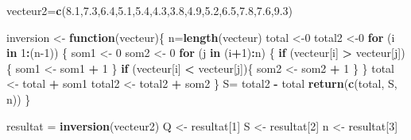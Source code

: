 \documentclass[
  12pt,
]{article}
\newenvironment{Shaded}{\begin{snugshade}}{\end{snugshade}}
\newcommand{\ControlFlowTok}[1]{\textcolor[rgb]{0.13,0.29,0.53}{\textbf{#1}}}
\newcommand{\DecValTok}[1]{\textcolor[rgb]{0.00,0.00,0.81}{#1}}
\newcommand{\FloatTok}[1]{\textcolor[rgb]{0.00,0.00,0.81}{#1}}
\newcommand{\FunctionTok}[1]{\textcolor[rgb]{0.13,0.29,0.53}{\textbf{#1}}}
\newcommand{\NormalTok}[1]{#1}
\newcommand{\OtherTok}[1]{\textcolor[rgb]{0.56,0.35,0.01}{#1}}
\newcommand{\SpecialCharTok}[1]{\textcolor[rgb]{0.81,0.36,0.00}{\textbf{#1}}}
\begin{document}
\begin{Shaded}
\begin{Highlighting}[]
\NormalTok{vecteur2}\OtherTok{=}\FunctionTok{c}\NormalTok{(}\FloatTok{8.1}\NormalTok{,}\FloatTok{7.3}\NormalTok{,}\FloatTok{6.4}\NormalTok{,}\FloatTok{5.1}\NormalTok{,}\FloatTok{5.4}\NormalTok{,}\FloatTok{4.3}\NormalTok{,}\FloatTok{3.8}\NormalTok{,}\FloatTok{4.9}\NormalTok{,}\FloatTok{5.2}\NormalTok{,}\FloatTok{6.5}\NormalTok{,}\FloatTok{7.8}\NormalTok{,}\FloatTok{7.6}\NormalTok{,}\FloatTok{9.3}\NormalTok{)}

\NormalTok{inversion }\OtherTok{\textless{}{-}} \ControlFlowTok{function}\NormalTok{(vecteur)\{}
\NormalTok{  n}\OtherTok{=}\FunctionTok{length}\NormalTok{(vecteur)}
\NormalTok{  total }\OtherTok{\textless{}{-}}\DecValTok{0}
\NormalTok{  total2 }\OtherTok{\textless{}{-}}\DecValTok{0}
  \ControlFlowTok{for}\NormalTok{ (i }\ControlFlowTok{in} \DecValTok{1}\SpecialCharTok{:}\NormalTok{(n}\DecValTok{{-}1}\NormalTok{)) \{}
\NormalTok{    som1 }\OtherTok{\textless{}{-}} \DecValTok{0}
\NormalTok{    som2 }\OtherTok{\textless{}{-}} \DecValTok{0}
    \ControlFlowTok{for}\NormalTok{ (j }\ControlFlowTok{in}\NormalTok{ (i}\SpecialCharTok{+}\DecValTok{1}\NormalTok{)}\SpecialCharTok{:}\NormalTok{n) \{}
      \ControlFlowTok{if}\NormalTok{ (vecteur[i] }\SpecialCharTok{\textgreater{}}\NormalTok{ vecteur[j]) \{}
\NormalTok{        som1 }\OtherTok{\textless{}{-}}\NormalTok{ som1 }\SpecialCharTok{+} \DecValTok{1} 
\NormalTok{      \}}
      \ControlFlowTok{if}\NormalTok{ (vecteur[i] }\SpecialCharTok{\textless{}}\NormalTok{ vecteur[j])\{ }
\NormalTok{        som2 }\OtherTok{\textless{}{-}}\NormalTok{ som2 }\SpecialCharTok{+} \DecValTok{1} 
\NormalTok{      \}}
\NormalTok{    \}}
\NormalTok{    total }\OtherTok{\textless{}{-}}\NormalTok{ total }\SpecialCharTok{+}\NormalTok{ som1}
\NormalTok{    total2 }\OtherTok{\textless{}{-}}\NormalTok{ total2 }\SpecialCharTok{+}\NormalTok{ som2}
\NormalTok{  \}}
\NormalTok{  S}\OtherTok{=}\NormalTok{ total2 }\SpecialCharTok{{-}}\NormalTok{ total}
  \FunctionTok{return}\NormalTok{(}\FunctionTok{c}\NormalTok{(total, S, n))}
\NormalTok{\}}

\NormalTok{resultat }\OtherTok{=} \FunctionTok{inversion}\NormalTok{(vecteur2)}
\NormalTok{Q }\OtherTok{\textless{}{-}}\NormalTok{ resultat[}\DecValTok{1}\NormalTok{]}
\NormalTok{S }\OtherTok{\textless{}{-}}\NormalTok{ resultat[}\DecValTok{2}\NormalTok{]}
\NormalTok{n }\OtherTok{\textless{}{-}}\NormalTok{ resultat[}\DecValTok{3}\NormalTok{]}
\end{Highlighting}
\end{Shaded}
\end{document}
